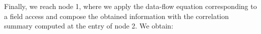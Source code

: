 \documentclass[11pt]{article}
\begin{document}
\begin{center}%
\end{center}

Finally, we reach node 1, where we apply the data-flow equation corresponding to a
field access and compose the obtained information with the correlation summary 
computed at the entry of node 2. We obtain:
\end{document}
